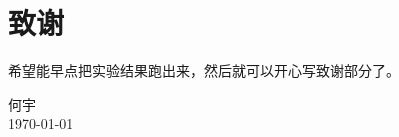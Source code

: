 
\chapter{致谢}

希望能早点把实验结果跑出来，然后就可以开心写致谢部分了。

\vskip 108pt
\begin{flushright}
	何宇\makebox[1cm]{} \\
	\today
\end{flushright}

